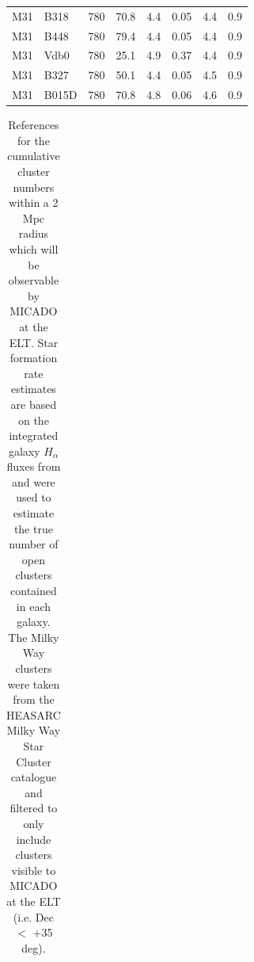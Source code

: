 \begin{appendix}
\begin{table}
\begin{tabular}{l l r r r r r r}
        M31    & B318         & 780      & 70.8 & 4.4       & 0.05    & 4.4            & 0.9           \\
        M31    & B448         & 780      & 79.4 & 4.4       & 0.05    & 4.4            & 0.9           \\
        M31    & Vdb0         & 780      & 25.1 & 4.9       & 0.37    & 4.4            & 0.9           \\
        M31    & B327         & 780      & 50.1 & 4.4       & 0.05    & 4.5            & 0.9           \\
        M31    & B015D        & 780      & 70.8 & 4.8       & 0.06    & 4.6            & 0.9           \\
        \hline
    \end{tabular}
\end{table}



\begin{table}
    \centering
    \caption{References for the cumulative cluster numbers within a 2 Mpc radius
    which will be observable by MICADO at the ELT. Star formation rate estimates 
    are based on the integrated galaxy $H_{\alpha}$ fluxes from \citet{karachentsev2013}
    and were used to estimate the true number of open clusters contained in each
    galaxy. The Milky Way clusters were taken from the HEASARC Milky Way Star Cluster
    catalogue \citep{heasarc_mwsc} and filtered to only include clusters visible to 
    MICADO at the ELT (i.e. Dec $<$ +35 deg).
    }
    \label{tbl:cum_cluster_refs}
    \begin{tabular}{lrrrl}
    

\end{tabular}
\end{table}
\end{appendix}
